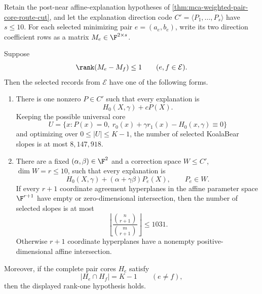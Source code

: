 \begin{theorem}
\label{thm:mca-rank-one-pair-anticode-router}
Retain the post-near affine-explanation hypotheses of
\cref{thm:mca-weighted-pair-core-route-cut}, and let the explanation
direction code \(C'=\langle P_1,\ldots,P_s\rangle\) have \(s\le10\).
For each selected minimizing pair \(e=(a_e,b_e)\), write its two direction
coefficient rows as a matrix \(M_e\in\F^{2\times s}\).

Suppose
\[
 \rank(M_e-M_f)\le1\qquad(e,f\in\mathcal E).
\]
Then the selected records from \(\mathcal E\) have one of the following
forms.
\begin{enumerate}[label=\textup{(\roman*)}]
\item There is one nonzero \(P\in C'\) such that every explanation is
\[
 H_0(X,\gamma)+cP(X).
\]
Keeping the possible universal core
\[
 U=\{x:P(x)=0,\ r_0(x)+\gamma r_1(x)-H_0(x,\gamma)\equiv0\}
\]
and optimizing over \(0\le |U|\le K-1\), the number of selected KoalaBear
slopes is at most \(8{,}147{,}918\).
\item There are a fixed \((\alpha,\beta)\in\F^2\) and a correction space
\(W\le C'\), \(\dim W=r\le10\), such that every explanation is
\[
 H_0(X,\gamma)+(\alpha+\gamma\beta)P_e(X),
 \qquad P_e\in W.
\]
If every \(r+1\) coordinate agreement hyperplanes in the affine parameter
space \(\F^{r+1}\) have empty or zero-dimensional intersection, then the
number of selected slopes is at most
\[
 \left\lfloor\frac{\binom n{r+1}}{\binom m{r+1}}\right\rfloor
 \le 1031.
\]
Otherwise \(r+1\) coordinate hyperplanes have a nonempty
positive-dimensional affine intersection.
\end{enumerate}
Moreover, if the complete pair cores \(H_e\) satisfy
\[
 |H_e\cap H_f|=K-1\qquad(e\ne f),
\]
then the displayed rank-one hypothesis holds.
\end{theorem}

